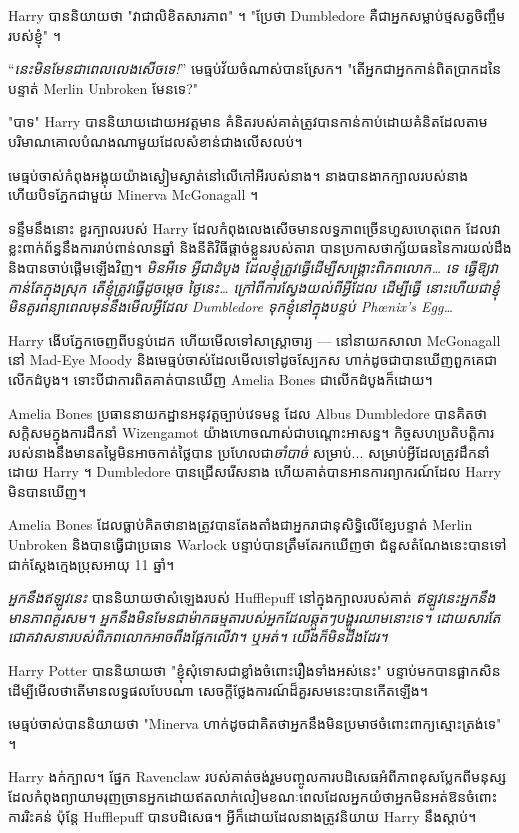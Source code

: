 Harry បាននិយាយថា "វាជាលិខិតសារភាព" ។ "ប្រែថា Dumbledore គឺជាអ្នកសម្លាប់ថ្មសត្វចិញ្ចឹមរបស់ខ្ញុំ" ។

“\emph{នេះមិនមែនជាពេលលេងសើចទេ!}” មេធ្មប់វ័យចំណាស់បានស្រែក។ "តើអ្នកជាអ្នកកាន់ពិតប្រាកដនៃបន្ទាត់ Merlin Unbroken មែនទេ?"

"បាទ" Harry បាននិយាយដោយអវត្តមាន គំនិតរបស់គាត់ត្រូវបានកាន់កាប់ដោយគំនិតដែលតាមបរិមាណគោលបំណងណាមួយដែលសំខាន់ជាងលើសលប់។

មេធ្មប់ចាស់កំពុងអង្គុយយ៉ាងស្ងៀមស្ងាត់នៅលើកៅអីរបស់នាង។ នាងបានងាកក្បាលរបស់នាង ហើយបិទភ្នែកជាមួយ Minerva McGonagall ។

ទន្ទឹមនឹងនោះ ខួរក្បាលរបស់ Harry ដែលកំពុងលេងសើចមានលទ្ធភាពច្រើនហួសហេតុពេក ដែលវាខ្លះពាក់ព័ន្ធនឹងការរាប់ពាន់លានឆ្នាំ និងនីតិវិធីផ្តាច់ខ្លួនរបស់តារា បានប្រកាសថាក្ស័យធននៃការយល់ដឹង និងបានចាប់ផ្តើមឡើងវិញ។ \emph{មិនអីទេ អ្វីជា\emph{ដំបូង} ដែលខ្ញុំត្រូវធ្វើដើម្បីសង្គ្រោះពិភពលោក… ទេ ធ្វើឱ្យវាកាន់តែក្នុងស្រុក តើខ្ញុំត្រូវធ្វើដូចម្តេច \emph{ថ្ងៃនេះ}… ក្រៅពីការស្វែងយល់ពីអ្វីដែល ដើម្បីធ្វើ នោះហើយជាខ្ញុំមិនគួរពន្យាពេលមុននឹងមើលអ្វីដែល Dumbledore ទុកខ្ញុំនៅក្នុងបន្ទប់ Phœnix's Egg…}

Harry ងើបភ្នែកចេញពីបន្ទប់ដេក ហើយមើលទៅសាស្រ្តាចារ្យ — នៅនាយកសាលា McGonagall នៅ Mad-Eye Moody និងមេធ្មប់ចាស់ដែលមើលទៅដូចស្បែកស ហាក់ដូចជាបានឃើញពួកគេជាលើកដំបូង។ ទោះបីជាការពិតគាត់បានឃើញ Amelia Bones ជាលើកដំបូងក៏ដោយ។

Amelia Bones ប្រធាននាយកដ្ឋានអនុវត្តច្បាប់វេទមន្ត ដែល Albus Dumbledore បានគិតថាសក្តិសមក្នុងការដឹកនាំ Wizengamot យ៉ាងហោចណាស់ជាបណ្តោះអាសន្ន។ កិច្ចសហប្រតិបត្តិការរបស់នាងនឹងមានតម្លៃមិនអាចកាត់ថ្លៃបាន ប្រហែលជា\emph{ចាំបាច់} សម្រាប់... សម្រាប់អ្វីដែលត្រូវដឹកនាំដោយ Harry ។ Dumbledore បានជ្រើសរើសនាង ហើយគាត់បានអានការព្យាករណ៍ដែល Harry មិនបានឃើញ។

Amelia Bones ដែលធ្លាប់គិតថានាងត្រូវបានតែងតាំងជាអ្នករាជានុសិទ្ធិលើខ្សែបន្ទាត់ Merlin Unbroken និងបានធ្វើជាប្រធាន Warlock បន្ទាប់បានត្រឹមតែរកឃើញថា ជំនួសតំណែងនេះបានទៅ ជាក់ស្តែងក្មេងប្រុសអាយុ 11 ឆ្នាំ។

\emph{អ្នកនឹងឥឡូវនេះ} បាននិយាយថាសំឡេងរបស់ Hufflepuff នៅក្នុងក្បាលរបស់គាត់ \emph{ឥឡូវនេះអ្នកនឹងមានភាពគួរសម។ អ្នក​នឹង​មិន​មែន​ជា​ម៉ាក​ធម្មតា​របស់​អ្នក​ដែល​ឆ្កួត​ៗ​បង្ហូរ​ឈាម​នោះ​ទេ។ ដោយសារតែជោគវាសនារបស់ពិភពលោកអាចពឹងផ្អែកលើវា។ ឬអត់។ យើង​ក៏​មិន​ដឹង​ដែរ។}

Harry Potter បាននិយាយថា "ខ្ញុំសុំទោសជាខ្លាំងចំពោះរឿងទាំងអស់នេះ" បន្ទាប់មកបានផ្អាកសិន ដើម្បីមើលថាតើមានលទ្ធផលបែបណា សេចក្តីថ្លែងការណ៍ដ៏គួរសមនេះបានកើតឡើង។

មេធ្មប់ចាស់បាននិយាយថា "Minerva ហាក់ដូចជាគិតថាអ្នកនឹងមិនប្រមាថចំពោះពាក្យស្មោះត្រង់ទេ" ។

Harry ងក់ក្បាល។ ផ្នែក Ravenclaw របស់គាត់ចង់រួមបញ្ចូលការបដិសេធអំពីភាពខុសប្លែកពីមនុស្សដែលកំពុងព្យាយាមរុញច្រានអ្នកដោយឥតលាក់លៀមខណៈពេលដែលអ្នកយំថាអ្នកមិនអត់ឱនចំពោះការរិះគន់ ប៉ុន្តែ Hufflepuff បានបដិសេធ។ អ្វីក៏ដោយដែលនាងត្រូវនិយាយ Harry នឹងស្តាប់។

